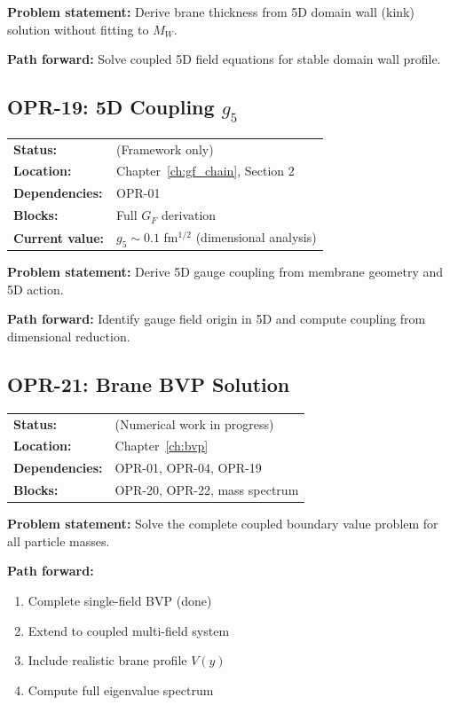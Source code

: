 \textbf{Problem statement:} Derive brane thickness from 5D domain wall
(kink) solution without fitting to $M_W$.

\textbf{Path forward:} Solve coupled 5D field equations for stable
domain wall profile.

\bigskip

\subsection*{OPR-19: 5D Coupling $g_5$}
\begin{tabular}{ll}
\textbf{Status:} & \tagOpen{} (Framework only) \\
\textbf{Location:} & Chapter~\ref{ch:gf_chain}, Section 2 \\
\textbf{Dependencies:} & OPR-01 \\
\textbf{Blocks:} & Full $G_F$ derivation \\
\textbf{Current value:} & $g_5 \sim 0.1$ fm$^{1/2}$ (dimensional analysis) \\
\end{tabular}

\textbf{Problem statement:} Derive 5D gauge coupling from membrane
geometry and 5D action.

\textbf{Path forward:} Identify gauge field origin in 5D and compute
coupling from dimensional reduction.

\bigskip

\subsection*{OPR-21: Brane BVP Solution}
\begin{tabular}{ll}
\textbf{Status:} & \tagOpen{} (Numerical work in progress) \\
\textbf{Location:} & Chapter~\ref{ch:bvp} \\
\textbf{Dependencies:} & OPR-01, OPR-04, OPR-19 \\
\textbf{Blocks:} & OPR-20, OPR-22, mass spectrum \\
\end{tabular}

\textbf{Problem statement:} Solve the complete coupled boundary value
problem for all particle masses.

\textbf{Path forward:}
\begin{enumerate}[nosep]
\item Complete single-field BVP (done)
\item Extend to coupled multi-field system
\item Include realistic brane profile $V(y)$
\item Compute full eigenvalue spectrum
\end{enumerate}

